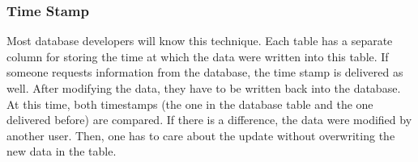 %
%
%
%
%
%
%

\subsubsection{Time Stamp}
\label{time_stamp_heading}

Most database developers will know this technique. Each table has a separate
column for storing the time at which the data were written into this table.
If someone requests information from the database, the time stamp is delivered
as well. After modifying the data, they have to be written back into the database.
At this time, both timestamps (the one in the database table and the one delivered
before) are compared. If there is a difference, the data were modified by another
user. Then, one has to care about the update without overwriting the new data in
the table.

